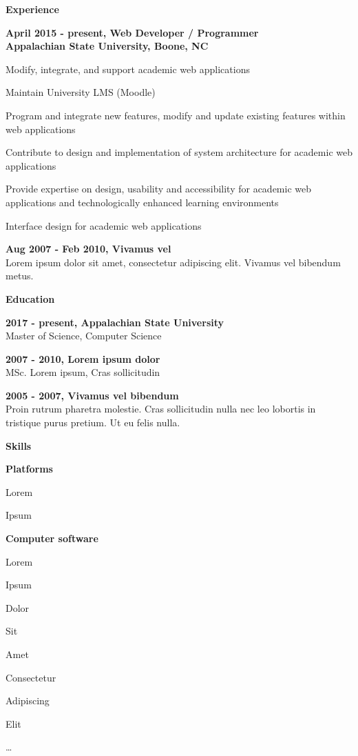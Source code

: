 \documentclass[a4paper,12pt,final]{memoir}
\newcommand{\Sep}{\vspace{1.5em}}
\newcommand{\SmallSep}{\vspace{0.5em}}
\newcommand{\CVSection}[1]
	{\Large\textbf{#1}\par
	\SmallSep\normalsize\normalfont}
\newcommand{\CVItem}[1]
	{\textbf{\color{BrickRed} #1}}
\begin{document}
\CVSection{Experience}
\CVItem{April 2015 - present, Web Developer / Programmer\\
Appalachian State University, Boone, NC}
\begin{compactitem}[\color{BrickRed}$\circ$]
	\item Modify, integrate, and support academic web applications
	\item Maintain University LMS (Moodle)
	\item Program and integrate new features, modify and update existing features within web applications
	\item Contribute to design and implementation of system architecture for academic web applications
	\item Provide expertise on design, usability and accessibility for academic web applications and technologically enhanced learning environments
	\item Interface design for academic web applications
\end{compactitem}
\SmallSep

\CVItem{Aug 2007 - Feb 2010, Vivamus vel}\\
Lorem ipsum dolor sit amet, consectetur adipiscing elit. Vivamus vel bibendum metus.
\Sep

\CVSection{Education}
\CVItem{2017 - present, Appalachian State University}\\
Master of Science, Computer Science
\SmallSep

\CVItem{2007 - 2010, Lorem ipsum dolor}\\
MSc. Lorem ipsum, Cras sollicitudin
\SmallSep

\CVItem{2005 - 2007, Vivamus vel bibendum}\\
Proin rutrum pharetra molestie. Cras sollicitudin nulla nec leo lobortis in tristique purus pretium. Ut eu felis nulla.
\Sep

\clearpage
\framebreak
\framebreak

\CVSection{Skills}
\CVItem{Platforms}
\begin{multicols}{3}
\begin{compactitem}[\color{BrickRed}$\circ$]
	\item Lorem 
	\item Ipsum 
\end{compactitem}
\end{multicols}
\SmallSep

\CVItem{Computer software}
\begin{multicols}{3}
\begin{compactitem}[\color{BrickRed}$\circ$]
	\item Lorem 
	\item Ipsum 
	\item Dolor 
	\item Sit 
	\item Amet
	\item Consectetur 
	\item Adipiscing 
	\item Elit
	\item \ldots
\end{compactitem}
\end{multicols}
\Sep 
\end{document}
